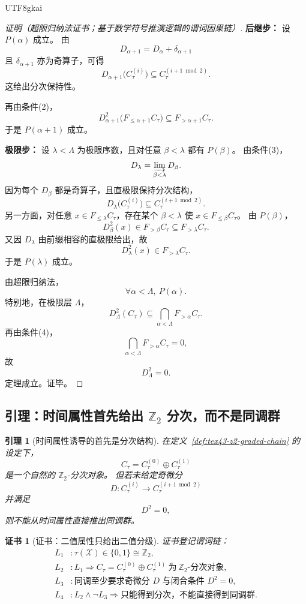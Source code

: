\documentclass[12pt]{article}
\newtheorem{lemma}{引理}[section]
\newtheorem{Certificate}{证书}[section]
\newcommand{\Ztwo}{\mathbb{Z}_2}
\begin{document}
\begin{CJK*}{UTF8}{gkai}
\begin{proof}[证明（超限归纳法证书；基于数学符号推演逻辑的谓词因果链）]
\textbf{后继步：}
设 $P(\alpha)$ 成立。
由
\[
  D_{\alpha+1}=D_\alpha+\delta_{\alpha+1}
\]
且 $\delta_{\alpha+1}$ 亦为奇算子，可得
\[
  D_{\alpha+1}\bigl(C_{\tau}^{(i)}\bigr)
  \subseteq
  C_{\tau}^{(i+1\bmod 2)}.
\]
这给出分次保持性。

再由条件(2)，
\[
  D_{\alpha+1}^2\bigl(F_{\le \alpha+1}C_{\tau}\bigr)\subseteq F_{>\alpha+1}C_{\tau}.
\]
于是 $P(\alpha+1)$ 成立。

\textbf{极限步：}
设 $\lambda<\Lambda$ 为极限序数，且对任意 $\beta<\lambda$ 都有 $P(\beta)$。
由条件(3)，
\[
  D_\lambda=\varinjlim_{\beta<\lambda}D_\beta.
\]
因为每个 $D_\beta$ 都是奇算子，且直极限保持分次结构，
\[
  D_\lambda\bigl(C_{\tau}^{(i)}\bigr)\subseteq C_{\tau}^{(i+1\bmod 2)}.
\]
另一方面，对任意 $x\in F_{\le \lambda}C_{\tau}$，存在某个 $\beta<\lambda$ 使 $x\in F_{\le \beta}C_{\tau}$。
由 $P(\beta)$，
\[
  D_\beta^2(x)\in F_{>\beta}C_{\tau}\subseteq F_{>\lambda}C_{\tau}.
\]
又因 $D_\lambda$ 由前缀相容的直极限给出，故
\[
  D_\lambda^2(x)\in F_{>\lambda}C_{\tau}.
\]
于是 $P(\lambda)$ 成立。

由超限归纳法，
\[
  \forall\alpha<\Lambda,\ P(\alpha).
\]
特别地，在极限层 $\Lambda$，
\[
  D_\Lambda^2(C_{\tau})\subseteq \bigcap_{\alpha<\Lambda}F_{>\alpha}C_{\tau}.
\]
再由条件(4)，
\[
  \bigcap_{\alpha<\Lambda}F_{>\alpha}C_{\tau}=0,
\]
故
\[
  D_\Lambda^2=0.
\]
定理成立。证毕。
\end{proof}

\subsection{引理：时间属性首先给出 \texorpdfstring{$\Ztwo$}{Z2} 分次，而不是同调群}
\label{subsec:tex43-ch2-lemma}

\begin{lemma}[时间属性诱导的首先是分次结构]
\label{lem:tex43-z2-grading-first}
在定义~\ref{def:tex43-z2-graded-chain} 的设定下，
\[
  C_{\tau}=C_{\tau}^{(0)}\oplus C_{\tau}^{(1)}
\]
是一个自然的 \(\Ztwo\)-分次对象。
但若未给定奇微分
\[
  D:C_{\tau}^{(i)}\to C_{\tau}^{(i+1\bmod 2)}
\]
并满足
\[
  D^2=0,
\]
则不能从时间属性直接推出同调群。
\end{lemma}

\begin{Certificate}[证书：二值属性只给出二值分级]
\label{cert:tex43-z2-grading-first}
证书登记谓词链：
\[
\begin{aligned}
  L_1 &: \tau(\mathcal X)\in\{0,1\}\cong \Ztwo,\\
  L_2 &: L_1 \Rightarrow C_{\tau}=C_{\tau}^{(0)}\oplus C_{\tau}^{(1)}\ \text{为}\ \Ztwo\text{-分次对象},\\
  L_3 &: \text{同调至少要求奇微分 }D\text{ 与闭合条件 }D^2=0,\\
  L_4 &: L_2\wedge \neg L_3 \Rightarrow \text{只能得到分次，不能直接得到同调群}.
\end{aligned}
\]
\end{Certificate}


\end{CJK*}
\end{document}
